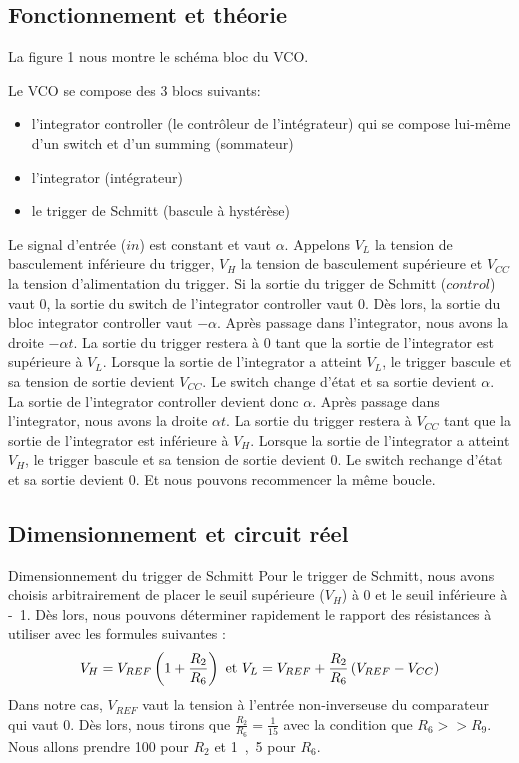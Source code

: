 
\subsection{Fonctionnement et théorie}
La figure 1 nous montre le schéma bloc du VCO.


Le VCO se compose des 3 blocs suivants:
\begin{itemize}
\item l'integrator controller (le contrôleur de l'intégrateur) qui se compose lui-même d'un switch et d'un summing (sommateur)
\item l'integrator (intégrateur)
\item le trigger de Schmitt (bascule à hystérèse)
\end{itemize}

Le signal d'entrée ($in$) est constant et vaut $\alpha$. Appelons $V_L$ la tension de basculement inférieure du trigger, $V_H$ la tension de basculement supérieure et $V_{CC}$ la tension d'alimentation du trigger.
Si la sortie du trigger de Schmitt ($control$) vaut $0$, la sortie du switch de l'integrator controller vaut $0$. Dès lors, la sortie du bloc integrator controller vaut $-\alpha$.  Après passage dans l'integrator, nous avons la droite $-\alpha t$. La sortie du trigger restera à $0$ tant que la sortie de l'integrator est supérieure à $V_L$. Lorsque la sortie de l'integrator a atteint $V_L$, le trigger bascule et sa tension de sortie devient $V_{CC}$. Le switch change d'état et sa sortie devient $\alpha$. La sortie de l'integrator controller devient donc $\alpha$. Après passage dans l'integrator, nous avons la droite $\alpha t$. La sortie du trigger restera à $V_{CC}$ tant que la sortie de l'integrator est inférieure à $V_H$. Lorsque la sortie de l'integrator a atteint $V_H$, le trigger bascule et sa tension de sortie devient $0$. Le switch rechange d'état et sa sortie devient $0$. Et nous pouvons recommencer la même boucle.

\subsection{Dimensionnement et circuit réel}
Dimensionnement du trigger de Schmitt
Pour le trigger de Schmitt, nous avons choisis arbitrairement de placer le seuil supérieure ($V_H$) à \unit{0}{\volt} et le seuil inférieure à \unit{-1}{\volt}. Dès lors, nous pouvons déterminer rapidement le rapport des résistances à utiliser avec les formules suivantes : 
$$V_H=V_{REF}\left(1+\frac{R_2}{R_6}\right) \textmd{ et } V_L=V_{REF} + \frac{R_2}{R_6}\left(V_{REF}-V_{CC}\right)$$
Dans notre cas, $V_{REF}$ vaut la tension à l'entrée non-inverseuse du comparateur qui vaut \unit{0}{\volt}. Dès lors, nous tirons que $\frac{R_2}{R_6}=\frac{1}{15}$
avec la condition que $R_6>>R_9$. Nous allons prendre \unit{100}{\kilo\ohm} pour $R_2$ et \unit{1,5}{\mega\ohm} pour $R_6$.

